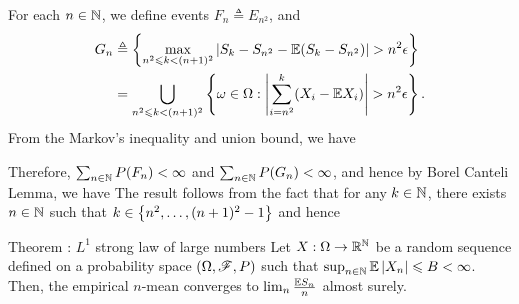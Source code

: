 \documentclass[12pt,aspectratio=169]{beamer}
\begin{document}
\begin{frame}
\begin{Proof} 
For each $n \in \mathbb{N}$, we define events $F_n \triangleq E_{n^2}$, and 
\begin{align*}
G_n 
&\triangleq \left\{\max_{n^2 \leqslant k < (n+1)^2}\left\lvert S_k-S_{n^2} - \mathbb{E}(S_k-S_{n^2})\right\rvert > n^2\epsilon\right\} \\
&= \bigcup_{n^2 \leqslant k < (n+1)^2}\left\{\omega \in \Omega: \left\lvert\sum_{i=n^2}^{k}(X_i - \mathbb{E} X_i)\right\rvert > n^2\epsilon\right\}.
\end{align*}
From the Markov's inequality and union bound, we have 
\end{Proof}
\end{frame}

\begin{frame}
\begin{Proof}
Therefore, $\sum_{n \in \mathbb{N}}P(F_n) < \infty$ and $\sum_{n \in \mathbb{N}}P(G_n) < \infty$, 
and hence by Borel Canteli Lemma, 
we have 
The result follows from the fact that for any $k \in \mathbb{N}$, there exists $n \in \mathbb{N}$  such that $k \in \left\{n^2, \dots, (n+1)^2-1\right\}$ and hence 
\end{Proof}
\end{frame}
\begin{frame}
\begin{block}{Theorem : $L^1$ strong law of large numbers} 
Let $X:\Omega\to\mathbb{R}^{\mathbb{N}}$ be a random sequence defined on a probability space $(\Omega,\mathscr{F},P)$ such that $\sup_{n\in\mathbb{N}}\mathbb{E}\left\lvert X_n\right\rvert \leqslant B < \infty$. %
Then, the empirical $n$-mean converges to $\lim_n\frac{\mathbb{E} S_n}{n}$ almost surely.
\end{block}
\end{frame}
\end{document}

